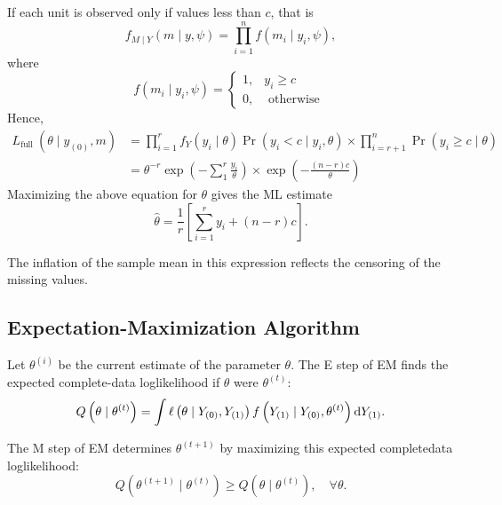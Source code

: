 \begin{example}
	If each unit is observed only if values less than \(c\), that is
	\begin{equation}
		f_{M\mid Y}(m\mid y,\psi)=\prod_{i=1}^{n}f\left(m_{i}\mid y_{i},\psi\right),
	\end{equation}
	where
	\begin{equation}
		f\left(m_{i} \mid y_{i}, \psi\right)=\left\{\begin{array}{ll}
			1, & y_{i}\geq c        \\
			0, & \text{ otherwise }
		\end{array}\right.
	\end{equation}
	Hence,
	\begin{equation}
		\begin{aligned}
			L_{\text {full }}\left(\theta \mid y_{(0)}, m\right) & =\prod_{i=1}^{r} f_{Y}\left(y_{i} \mid \theta\right)\Pr\left(y_{i}<c \mid y_{i}, \theta\right) \times \prod_{i=r+1}^{n}\Pr\left(y_{i} \geq c \mid \theta\right) \\
			                                                     & =\theta^{-r} \exp \left(-\sum_{1}^{r} \frac{y_{i}}{\theta}\right) \times \exp \left(-\frac{(n-r) c}{\theta}\right)
		\end{aligned}
	\end{equation}
	Maximizing the above equation for \(\theta\) gives the ML estimate
	\begin{equation}
		\hat{\theta}=\frac{1}{r}\left[\sum_{i=1}^{r}y_{i}+(n-r)c\right].
	\end{equation}

	The inflation of the sample mean in this expression reflects the censoring of the missing values.
\end{example}

\subsection{Expectation-Maximization Algorithm}

Let \(\theta^{(i)}\) be the current estimate of the parameter \(\theta\). The E step of EM finds the expected complete-data loglikelihood if \(\theta\) were \(\theta^{(t)}\):
\begin{equation}
	Q\left(\theta \mid \theta^{(t)}\right)=\int\ell\left(\theta \mid Y_{(0)}, Y_{(1)}\right) f\left(Y_{(1)} \mid Y_{(0)}, \theta^{(t)}\right) \mathop{}\!\mathrm{d} Y_{(1)}.
\end{equation}

The M step of EM determines \(\theta^{(t+1)}\) by maximizing this expected completedata loglikelihood:
\begin{equation}
	Q\left(\theta^{(t+1)} \mid \theta^{(t)}\right) \geq Q\left(\theta \mid \theta^{(t)}\right), \quad \forall\theta.
\end{equation}


